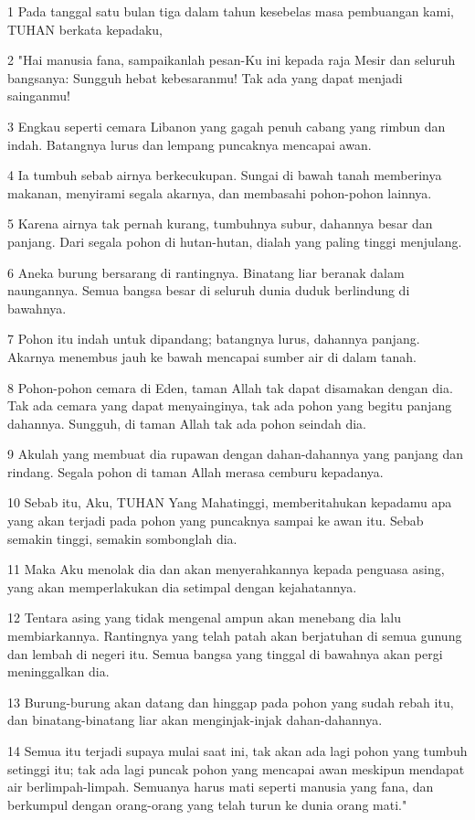 \par 1 Pada tanggal satu bulan tiga dalam tahun kesebelas masa pembuangan kami, TUHAN berkata kepadaku,
\par 2 "Hai manusia fana, sampaikanlah pesan-Ku ini kepada raja Mesir dan seluruh bangsanya: Sungguh hebat kebesaranmu! Tak ada yang dapat menjadi sainganmu!
\par 3 Engkau seperti cemara Libanon yang gagah penuh cabang yang rimbun dan indah. Batangnya lurus dan lempang puncaknya mencapai awan.
\par 4 Ia tumbuh sebab airnya berkecukupan. Sungai di bawah tanah memberinya makanan, menyirami segala akarnya, dan membasahi pohon-pohon lainnya.
\par 5 Karena airnya tak pernah kurang, tumbuhnya subur, dahannya besar dan panjang. Dari segala pohon di hutan-hutan, dialah yang paling tinggi menjulang.
\par 6 Aneka burung bersarang di rantingnya. Binatang liar beranak dalam naungannya. Semua bangsa besar di seluruh dunia duduk berlindung di bawahnya.
\par 7 Pohon itu indah untuk dipandang; batangnya lurus, dahannya panjang. Akarnya menembus jauh ke bawah mencapai sumber air di dalam tanah.
\par 8 Pohon-pohon cemara di Eden, taman Allah tak dapat disamakan dengan dia. Tak ada cemara yang dapat menyainginya, tak ada pohon yang begitu panjang dahannya. Sungguh, di taman Allah tak ada pohon seindah dia.
\par 9 Akulah yang membuat dia rupawan dengan dahan-dahannya yang panjang dan rindang. Segala pohon di taman Allah merasa cemburu kepadanya.
\par 10 Sebab itu, Aku, TUHAN Yang Mahatinggi, memberitahukan kepadamu apa yang akan terjadi pada pohon yang puncaknya sampai ke awan itu. Sebab semakin tinggi, semakin sombonglah dia.
\par 11 Maka Aku menolak dia dan akan menyerahkannya kepada penguasa asing, yang akan memperlakukan dia setimpal dengan kejahatannya.
\par 12 Tentara asing yang tidak mengenal ampun akan menebang dia lalu membiarkannya. Rantingnya yang telah patah akan berjatuhan di semua gunung dan lembah di negeri itu. Semua bangsa yang tinggal di bawahnya akan pergi meninggalkan dia.
\par 13 Burung-burung akan datang dan hinggap pada pohon yang sudah rebah itu, dan binatang-binatang liar akan menginjak-injak dahan-dahannya.
\par 14 Semua itu terjadi supaya mulai saat ini, tak akan ada lagi pohon yang tumbuh setinggi itu; tak ada lagi puncak pohon yang mencapai awan meskipun mendapat air berlimpah-limpah. Semuanya harus mati seperti manusia yang fana, dan berkumpul dengan orang-orang yang telah turun ke dunia orang mati."
